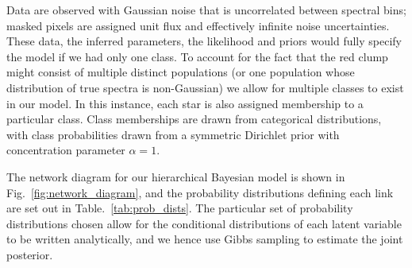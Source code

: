 \documentclass[a4paper,fleqn,usenatbib]{mnras}
\begin{document}
Data are observed with Gaussian noise that is uncorrelated between spectral bins; masked pixels are assigned unit flux and effectively infinite noise uncertainties. These data, the inferred parameters, the likelihood and priors would fully specify the model if we had only one class. To account for the fact that the red clump might consist of multiple distinct populations (or one population whose distribution of true spectra is non-Gaussian) we allow for multiple classes to exist in our model. In this instance, each star is also assigned membership to a particular class. Class memberships are drawn from categorical distributions, with class probabilities drawn from a symmetric Dirichlet prior with concentration parameter $\alpha=1$.

The network diagram for our hierarchical Bayesian model is shown in Fig.~\ref{fig:network_diagram}, and the probability distributions defining each link are set out in Table.~\ref{tab:prob_dists}. The particular set of probability distributions chosen allow for the conditional distributions of each latent variable to be written analytically, and we hence use Gibbs sampling to estimate the joint posterior.
\end{document}
